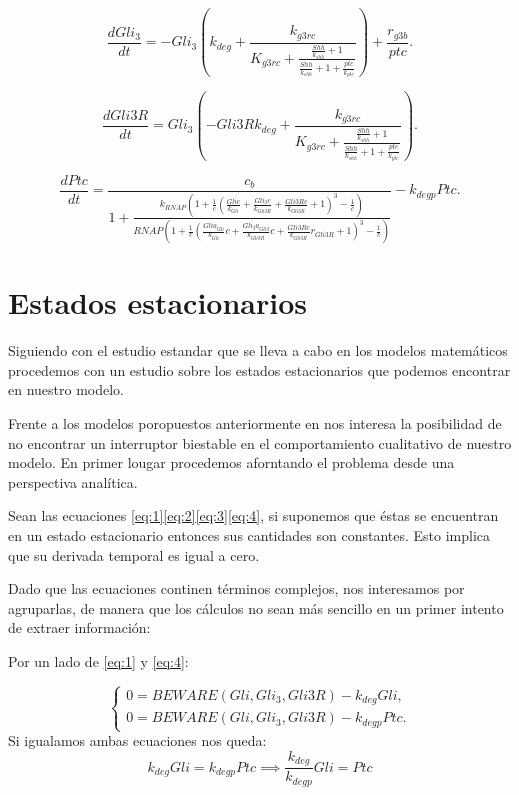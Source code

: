 \begin{equation}
\frac{dGli_3}{dt}=- Gli_{3} \left(k_{deg} + \frac{k_{g3rc}}{K_{g3rc} + \frac{\frac{Shh}{k_{shh}} + 1}{\frac{Shh}{k_{shh}} + 1 + \frac{ptc}{k_{ptc}}}}\right) + \frac{r_{g3b}}{ptc}.
\end{equation}

\begin{equation}
\frac{dGli3R}{dt}=Gli_{3} \left(- Gli3R k_{deg} + \frac{k_{g3rc}}{K_{g3rc} + \frac{\frac{Shh}{k_{shh}} + 1}{\frac{Shh}{k_{shh}} + 1 + \frac{ptc}{k_{ptc}}}}\right).
\end{equation}

\begin{equation}
\frac{dPtc}{dt}=\frac{c_{b}}{1 + \frac{k_{RNAP} \left(1 + \frac{1}{c} \left(\frac{Gli c}{k_{Gli}} + \frac{Gli_{3} c}{k_{Gli3R}} + \frac{Gli3R c}{k_{Gli3R}} + 1\right)^{3} - \frac{1}{c}\right)}{RNAP \left(1 + \frac{1}{c} \left(\frac{Gli a_{Gli}}{k_{Gli}} c + \frac{Gli_{3} a_{Gli3}}{k_{Gli3R}} c + \frac{Gli3R c}{k_{Gli3R}} r_{Gli3R} + 1\right)^{3} - \frac{1}{c}\right)}} - k_{deg p} Ptc.
\end{equation}




\section{Estados estacionarios}
Siguiendo con el estudio estandar que se lleva a cabo en los modelos matemáticos procedemos con un estudio sobre los estados estacionarios que podemos encontrar en nuestro modelo.

Frente a los modelos poropuestos anteriormente en \cite{saha,schaffer} nos interesa la posibilidad de no encontrar un interruptor biestable en el comportamiento cualitativo de nuestro modelo. En primer lougar procedemos aforntando el problema desde una perspectiva analítica. 

Sean las ecuaciones \ref{eq:1}\ref{eq:2}\ref{eq:3}\ref{eq:4}, si suponemos que éstas se encuentran en un estado estacionario entonces sus cantidades son constantes. Esto implica que su derivada temporal es igual a cero.

Dado que las ecuaciones continen términos complejos, nos interesamos por agruparlas, de manera que los cálculos no sean más sencillo en un primer intento de extraer información:

Por un lado de \ref{eq:1} y \ref{eq:4}:

$$\begin{cases} 0 = BEWARE(Gli, Gli_3, Gli3R)-k_{deg}Gli, \\0= BEWARE(Gli, Gli_3, Gli3R)-k_{degp}Ptc. \end{cases}$$
Si igualamos ambas ecuaciones nos queda:
\begin{equation}
 k_{deg}Gli=k_{degp}Ptc \implies \frac{k_{deg}}{k_{degp}}Gli=Ptc
\end{equation}

